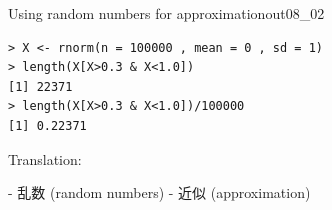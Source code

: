 \begin{Rscreen}{Using random numbers for approximation}{out08_02}
	\begin{verbatim}
> X <- rnorm(n = 100000 , mean = 0 , sd = 1)
> length(X[X>0.3 & X<1.0])
[1] 22371
> length(X[X>0.3 & X<1.0])/100000
[1] 0.22371
\end{verbatim}
\end{Rscreen}

Translation:

- 乱数 (random numbers)
- 近似 (approximation)
